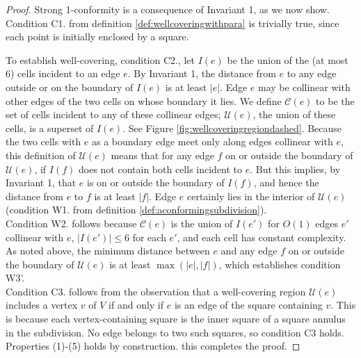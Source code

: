 \begin{proof}
Strong 1-conformity is a consequence of Invariant 1, as we now show. Condition C1. from definition \ref{def:wellcoveringwithpara} is trivially true, since each point is initially enclosed by a square. 

To establish well-covering, condition C2., let $I(e)$ be the union of the (at most 6) cells incident to an edge $e$. By Invariant 1, the distance from $e$ to any edge outside or on the boundary of $I(e)$ is at least $|e|$. Edge $e$ may be collinear with other edges of the two cells on whose boundary it lies. We define $\mathcal{C}(e)$ to be the set of cells incident to any of these collinear edges; $\mathcal{U}(e)$, the union of these cells, is a superset of $I(e)$. See Figure \ref{fig:wellcoveringregiondashed}. Because the two cells with $e$ as a boundary edge meet only along edges collinear with $e$, this definition of $\mathcal{U}(e)$ means that for any edge $f$ on or outside the boundary of $\mathcal{U}(e)$, if $I(f)$ does not contain both cells incident to $e$. But this implies, by Invariant 1, that $e$ is on or outside the boundary of $I(f)$, and hence the distance from $e$ to $f$ is at least $|f|$. Edge $e$ certainly lies in the interior of $\mathcal{U}(e)$ (condition W1. from definition \ref{def:aconformingsubdivision}). \\

Condition W2. follows because $\mathcal{C}(e)$ is the union of $I(e')$ for $O(1)$ edges $e'$ collinear with $e$, $|I(e')|\leq 6$ for each $e'$, and each cell has constant complexity. As noted above, the minimum distance between $e$ and any edge $f$ on or outside the boundary of $\mathcal{U}(e)$ is at least $\max(|e|,|f|)$, which establishes condition W3'. \\

Condition C3. follows from the observation that a well-covering region $\mathcal{U}(e)$ includes a vertex $v$ of $V$ if and only if $e$ is an edge of the square containing $v$. This is because each vertex-containing square is the inner square of a square annulus in the subdivision. No edge belongs to two such squares, so condition C3 holds. \\

Properties (1)-(5) holds by construction. this completes the proof.
\end{proof}

